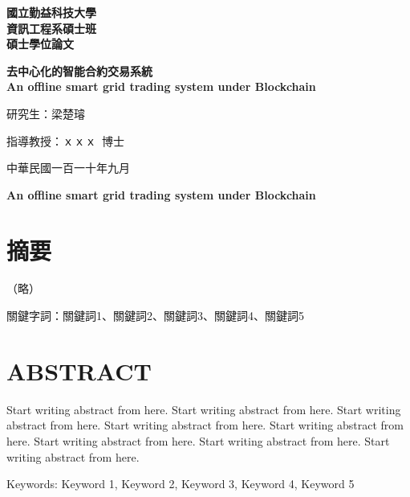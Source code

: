 \let\oldthesection\thesection
\renewcommand{\thesection}{}

\begin{titlepage}
	\renewcommand{\baselinestretch}{1.2}
	\begin{center}
		\Huge
		\textbf{國立勤益科技大學\\
			\vspace{1mm}
			資訊工程系碩士班\\
			\vspace{1mm}
			碩士學位論文}

		\vspace{2cm}
		\Huge
		\bfseries
		去中心化的智能合約交易系統\\
		{\LARGE An offline smart grid trading system under Blockchain}

		\vspace{1.5cm}

		\LARGE
		研究生：梁楚璿
		\vspace{1.5cm}

		指導教授：ｘｘｘ\ 博士

		\vfill

		中華民國一百一十年九月

	\end{center}
	\newpage
\end{titlepage}

\begin{center} %
	\Large
	\textbf{An offline smart grid trading system under Blockchain}
\end{center}

\section{摘要}
\begin{center}
	（略）
\end{center}

\noindent 關鍵字詞：關鍵詞1、關鍵詞2、關鍵詞3、關鍵詞4、關鍵詞5

\newpage

\section{ABSTRACT}
Start writing abstract from here. Start writing abstract from here. Start writing abstract from here. Start writing abstract from here. Start writing abstract from here. Start writing abstract from here. Start writing abstract from here. Start writing abstract from here.

Keywords: Keyword 1, Keyword 2, Keyword 3, Keyword 4, Keyword 5

\newpage

\tableofcontents
\newpage

\listoftables
\newpage

\listoffigures
\newpage


\setcounter{section}{0} %
\renewcommand{\thesection}{\oldthesection}
